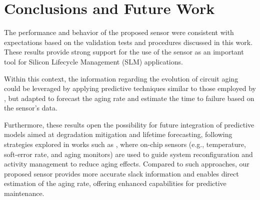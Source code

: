 \documentclass[a4paper,10pt,twoside,twocolumn,final]{JICS_LaTexGuidelines}
\begin{document}
\section{Conclusions and Future Work} \label{sec:conclusion}


The performance and behavior of the proposed sensor were consistent with expectations based on the validation tests and procedures discussed in this work. These results provide strong support for the use of the sensor as an important tool for Silicon Lifecycle Management (SLM) applications.

Within this context, the information regarding the evolution of circuit aging could be leveraged by applying predictive techniques similar to those employed by \cite{chen2022solar_prediction}, but adapted to forecast the aging rate and estimate the time to failure based on the sensor's data.

Furthermore, these results open the possibility for future integration of predictive models aimed at degradation mitigation and lifetime forecasting, following strategies explored in works such as \cite{CNNfabian}, where on-chip sensors (e.g., temperature, soft-error rate, and aging monitors) are used to guide system reconfiguration and activity management to reduce aging effects. Compared to such approaches, our proposed sensor provides more accurate slack information and enables direct estimation of the aging rate, offering enhanced capabilities for predictive maintenance.


 







\end{document}
